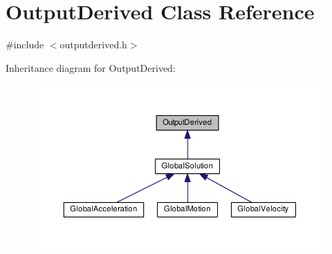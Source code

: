 \hypertarget{class_output_derived}{\section{Output\-Derived Class Reference}
\label{class_output_derived}
}


{\ttfamily \#include $<$outputderived.\-h$>$}



Inheritance diagram for Output\-Derived\-:\nopagebreak
\begin{figure}[H]
\begin{center}
\leavevmode
\includegraphics[width=350pt]{class_output_derived__inherit__graph}
\end{center}
\end{figure}
